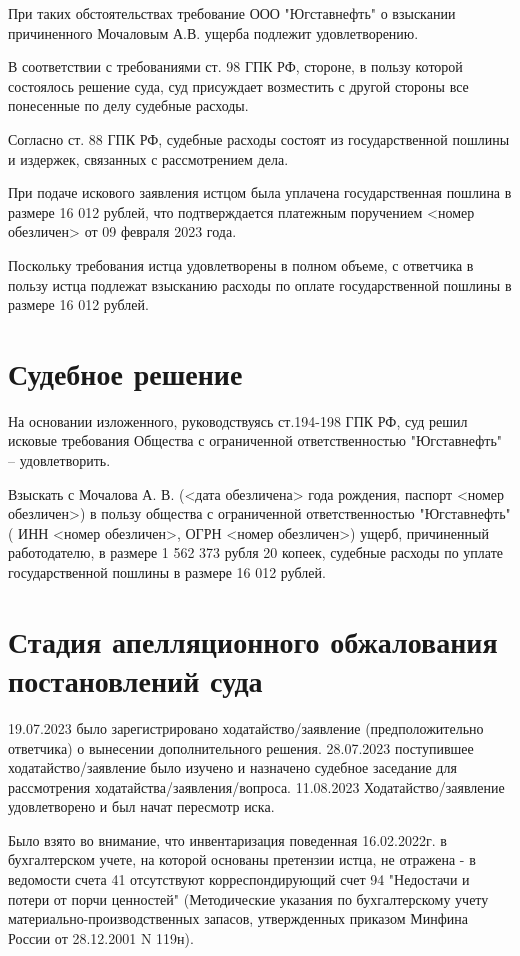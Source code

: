 \documentclass[a4paper]{article}
\begin{document}
		При таких обстоятельствах требование ООО "Югставнефть" о взыскании причиненного Мочаловым А.В. ущерба подлежит удовлетворению.
		
		В соответствии с требованиями ст. 98 ГПК РФ, стороне, в пользу которой состоялось решение суда, суд присуждает возместить с другой стороны все понесенные по делу судебные расходы.
		
		Согласно ст. 88 ГПК РФ, судебные расходы состоят из государственной пошлины и издержек, связанных с рассмотрением дела.
		
		При подаче искового заявления истцом была уплачена государственная пошлина в размере 16 012 рублей, что подтверждается платежным поручением <номер обезличен> от 09 февраля 2023 года.
		
		Поскольку требования истца удовлетворены в полном объеме, с ответчика в пользу истца подлежат взысканию расходы по оплате государственной пошлины в размере 16 012 рублей.
	
	\section{Судебное решение}
		На основании изложенного, руководствуясь ст.194-198 ГПК РФ, суд решил исковые требования Общества с ограниченной ответственностью "Югставнефть" – удовлетворить.
		
		Взыскать с Мочалова А. В. (<дата обезличена> года рождения, паспорт <номер обезличен>) в пользу общества с ограниченной ответственностью "Югставнефть" ( ИНН <номер обезличен>, ОГРН <номер обезличен>) ущерб, причиненный работодателю, в размере 1 562 373 рубля 20 копеек, судебные расходы по уплате государственной пошлины в размере 16 012 рублей.
	
	\section{Стадия апелляционного обжалования постановлений суда}
		19.07.2023 было зарегистрировано ходатайство/заявление (предположительно ответчика) о вынесении дополнительного решения. 28.07.2023 поступившее ходатайство/заявление было изучено и назначено судебное заседание для рассмотрения ходатайства/заявления/вопроса. 11.08.2023 Ходатайство/заявление удовлетворено и был начат пересмотр иска.
		
		Было взято во внимание, что инвентаризация поведенная 16.02.2022г. в бухгалтерском учете, на которой основаны претензии истца, не отражена - в ведомости счета 41 отсутствуют корреспондирующий счет 94 "Недостачи и потери от порчи ценностей" (Методические указания по бухгалтерскому учету материально-производственных запасов, утвержденных приказом Минфина России от 28.12.2001 N 119н).
		
\end{document}
